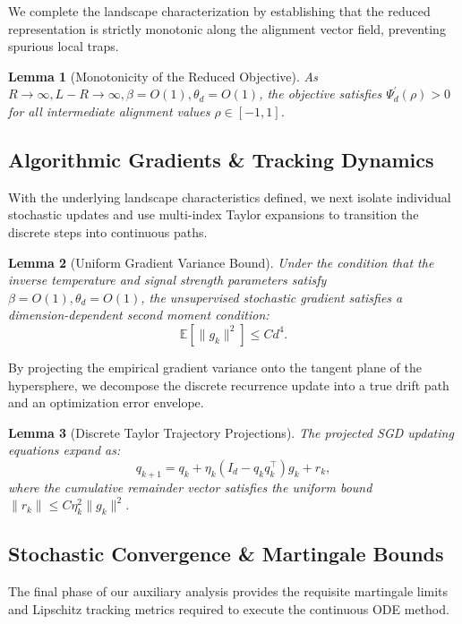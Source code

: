 \documentclass[10pt,a4paper]{amsart}
\newtheorem{lemma}{Lemma}
\begin{document}
\noindent We complete the landscape characterization by establishing that the reduced representation is strictly monotonic along the alignment vector field, preventing spurious local traps.

\begin{lemma}[Monotonicity of the Reduced Objective] \label{lem:lem4}
As $R \to \infty, L-R \to \infty, \beta=O(1), \theta_d =O(1)$, the objective satisfies $\Psi_{d}^{\prime}(\rho) > 0$ for all intermediate alignment values $\rho \in [-1,1]$.
\end{lemma}


\subsection{Algorithmic Gradients \& Tracking Dynamics}
With the underlying landscape characteristics defined, we next isolate individual stochastic updates and use multi-index Taylor expansions to transition the discrete steps into continuous paths.

\begin{lemma}[Uniform Gradient Variance Bound] \label{lem:lem5}
Under the condition that the inverse temperature and signal strength parameters satisfy $\beta =O(1), \theta_d = O(1)$, the unsupervised stochastic gradient satisfies a dimension-dependent second moment condition:
\begin{equation}
    \mathbb{E}\left[ \|g_k\|^{2} \right] \le C d^{4}.
\end{equation}
\end{lemma}

\noindent By projecting the empirical gradient variance onto the tangent plane of the hypersphere, we decompose the discrete recurrence update into a true drift path and an optimization error envelope.

\begin{lemma}[Discrete Taylor Trajectory Projections] \label{lem:lem6}
The projected SGD updating equations expand as:
\begin{equation}
    q_{k+1} = q_k + \eta_k(I_d - q_k q_k^{\top})g_k + r_k,
\end{equation}
where the cumulative remainder vector satisfies the uniform bound $\|r_k\| \le C \eta_k^{2} \|g_k\|^{2}$.
\end{lemma}


\subsection{Stochastic Convergence \& Martingale Bounds}
The final phase of our auxiliary analysis provides the requisite martingale limits and Lipschitz tracking metrics required to execute the continuous ODE method.
\end{document}
